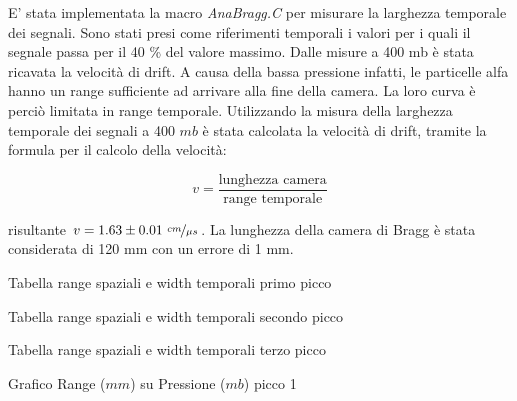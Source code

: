 E' stata implementata la macro \textit{AnaBragg.C} per misurare la larghezza temporale dei segnali. Sono stati presi come riferimenti temporali i valori per i quali il segnale
passa per il 40 \% del valore massimo. 
Dalle misure a 400 mb è stata ricavata la velocità di drift. A causa della bassa pressione infatti, le particelle alfa hanno un range sufficiente ad arrivare alla fine della camera. La loro curva è perciò limitata in range temporale. 
Utilizzando la misura della larghezza temporale dei segnali a 400 $mb$ è stata calcolata la velocità di drift, 
tramite la formula per il calcolo della velocità:

$$ v=\frac{\textrm{lunghezza camera}}{\textrm{range temporale}} $$

risultante $v = 1.63 \pm 0.01 \ \nicefrac{cm}{\mu s}$. La lunghezza della camera di Bragg è stata considerata di 120 mm con un errore di 1 mm.

\begin{tabella}
 \centering
  
 \caption{Tabella range spaziali e width temporali primo picco}
 \label{tab:range_picco1.tex}
\end{tabella}

\begin{tabella}
 \centering
  
 \caption{Tabella range spaziali e width temporali secondo picco}
 \label{tab:range_picco2.tex}
\end{tabella}

\begin{tabella}
 \centering
  
 \caption{Tabella range spaziali e width temporali terzo picco}
 \label{tab:range_picco3.tex}
\end{tabella}



\begin{grafico}
 \centering
 \caption{Grafico Range ($mm$) su Pressione ($mb$) picco 1} 
 \label{gr:rangepicco1.tex} 
\end{grafico}


